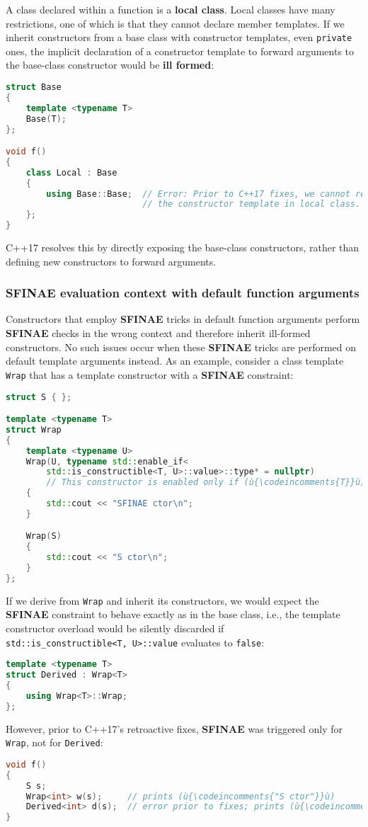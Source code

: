 A class declared within a function is a \textbf{local class}. Local classes have many restrictions, one of which is that they cannot declare member templates. If we inherit constructors from a base class with constructor templates, even \texttt{private} ones, the implicit declaration of a constructor template to forward arguments to the base-class constructor would be \textbf{ill formed}:
\begin{lstlisting}[language=C++]
struct Base
{
    template <typename T>
    Base(T);
};

void f()
{
    class Local : Base
    {
        using Base::Base;  // Error: Prior to C++17 fixes, we cannot redeclare
                           // the constructor template in local class.
    };
}
\end{lstlisting}
    C++17 resolves this by directly exposing the base-class constructors, rather than defining new constructors to forward arguments.

\subsubsection[SFINAE evaluation context with default function arguments]{SFINAE evaluation context with default function arguments}

Constructors that employ \textbf{SFINAE} tricks in default function arguments perform \mbox{\textbf{SFINAE}} checks in the wrong context and therefore inherit ill-formed constructors. No such issues occur when these \textbf{SFINAE} tricks are performed on default template arguments instead. As an example, consider a class template \texttt{Wrap} that has a template constructor with a \textbf{SFINAE} constraint:
\begin{lstlisting}[language=C++]
struct S { };

template <typename T>
struct Wrap
{
    template <typename U>
    Wrap(U, typename std::enable_if<
        std::is_constructible<T, U>::value>::type* = nullptr)
        // This constructor is enabled only if (ù{\codeincomments{T}}ù) is constructible from (ù{\codeincomments{U}}ù).
    {
        std::cout << "SFINAE ctor\n";
    }

    Wrap(S)
    {
        std::cout << "S ctor\n";
    }
};
\end{lstlisting}
    If we derive from \texttt{Wrap} and inherit its constructors, we would expect the \textbf{SFINAE} constraint to behave exactly as in the base class, i.e., the template constructor overload would be silently discarded if \texttt{std::is\_constructible<T,}~\texttt{U>::value} evaluates to \texttt{false}:
\begin{lstlisting}[language=C++]
template <typename T>
struct Derived : Wrap<T>
{
    using Wrap<T>::Wrap;
};
\end{lstlisting}
    However, prior to C++17’s retroactive fixes, \textbf{SFINAE} was triggered only for \texttt{Wrap}, not for \texttt{Derived}:
\begin{lstlisting}[language=C++]
void f()
{
    S s;
    Wrap<int> w(s);     // prints (ù{\codeincomments{"S ctor"}}ù)
    Derived<int> d(s);  // error prior to fixes; prints (ù{\codeincomments{"S ctor"}}ù) afterward
}
\end{lstlisting}

